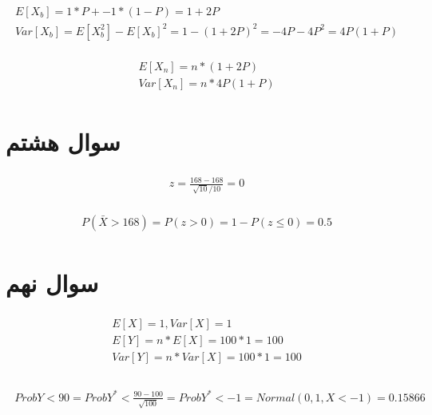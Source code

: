 \documentclass[paper=a4, fontsize=11pt]{article}
\numberwithin{equation}{section} %
\numberwithin{figure}{section} %
\numberwithin{table}{section} %
\begin{document}
\begin{align}
\begin{split}
    E[X_b] = 1 * P + -1 * (1 - P) =  1 + 2P\\
    Var[X_b] = E[X_b^2] - E[X_b]^2 = 1 - (1 + 2P)^2 = -4P - 4P^2 = 4P(1 + P)
\end{split}
\end{align}

\begin{align}
\begin{split}
    E[X_n] = n * (1 + 2P) \\
    Var[X_n] = n * 4P(1 + P)
\end{split}
\end{align}


\section{سوال هشتم}

\begin{align}
\begin{split}
    z = \frac{168 - 168}{\sqrt{10}/10} = 0
\end{split}
\end{align}

\begin{align}
\begin{split}
    P(\bar{X} > 168) = P(z > 0) = 1 - P(z \le 0) = 0.5 
\end{split}
\end{align}

\section{سوال نهم}

\begin{align}
\begin{split}
    E[X] = 1, Var[X] = 1\\
    E[Y] = n * E[X] = 100 * 1 = 100\\
    Var[Y] = n * Var[X]  = 100 * 1 = 100\\
\end{split}
\end{align}

\begin{align}
\begin{split}
    Prob{Y < 90} = Prob{Y^* < \frac{90 - 100}{\sqrt{100}}} = Prob{Y^* < -1} = Normal(0, 1, X < -1) = 0.15866
\end{split}
\end{align}
\end{document}
